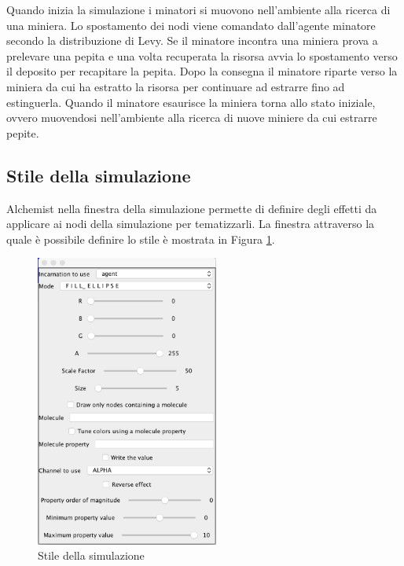 Quando inizia la simulazione i minatori si muovono nell'ambiente alla ricerca di una miniera. Lo spostamento dei nodi viene comandato dall'agente minatore secondo la distribuzione di Levy.
Se il minatore incontra una miniera prova a prelevare una pepita e una volta recuperata la risorsa avvia lo spostamento verso il deposito per recapitare la pepita. Dopo la consegna il minatore riparte verso la miniera da cui ha estratto la risorsa per continuare ad estrarre fino ad estinguerla.
Quando il minatore esaurisce la miniera torna allo stato iniziale, ovvero muovendosi nell'ambiente alla ricerca di nuove miniere da cui estrarre pepite.


\subsection{Stile della simulazione}
Alchemist nella finestra della simulazione permette di definire degli effetti da applicare ai nodi della simulazione per tematizzarli. La finestra attraverso la quale è possibile definire lo stile è mostrata in Figura \ref{fig:tematizzazioneSimulazione}.

\begin{figure} %
\begin{center} %
\includegraphics[width=6cm]{images/tematizzazioneSimulazione.png} %
\caption[Stile della simulazione]{Stile della simulazione} \label{fig:tematizzazioneSimulazione}
\end{center}
\end{figure}

